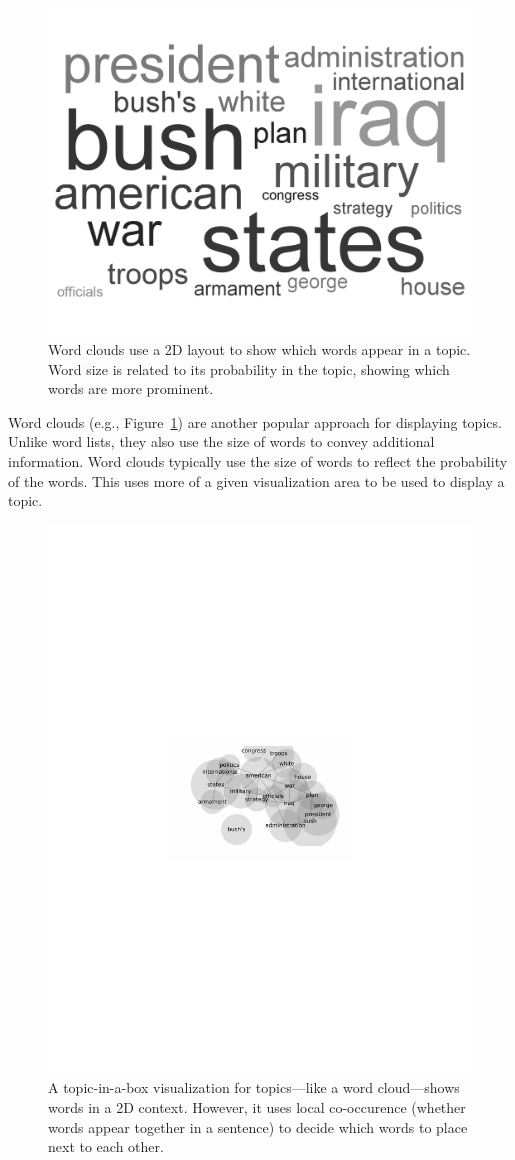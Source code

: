 \begin{figure}
  \begin{center}
    \includegraphics[width=.5\linewidth]{figures/wordcloud_20}
  \end{center}
  \caption{Word clouds use a 2D layout to show which words appear in a
  topic.  Word size is related to its probability in the topic,
  showing which words are more prominent.}
  \label{fig:word-cloud}
\end{figure}

Word clouds (e.g., Figure~\ref{fig:word-cloud}) are another popular approach for
displaying topics.  Unlike word lists, they also use the size of words to convey
additional information. Word clouds typically use the size of words to reflect
the probability of the words.  This uses more of a given visualization area to
be used to display a topic.

\begin{figure}
  \begin{center}
    \includegraphics[width=.5\linewidth]{figures/topic_in_a_box_20}
  \end{center}
  \caption{A topic-in-a-box visualization for topics---like a word
    cloud---shows words in a 2D context.  However, it uses local
    co-occurence (whether words appear together in a sentence) to decide which words to place next to each other.}
  \label{fig:topic-in-a-box}
\end{figure}

